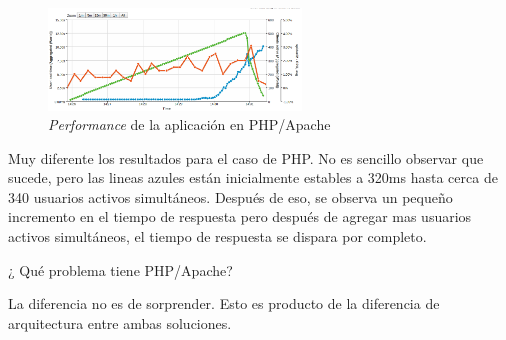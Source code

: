 

\begin{figure}[h!]
	\centering
	\includegraphics[width=0.6\textwidth]{figuras/cap2/phpapache_benchmak_loadimpact.png}
	\caption{\textit{Performance} de la aplicación en PHP/Apache}
	\label{cap2:figure:java_benchmark_paypal}
\end{figure}

Muy diferente los resultados para el caso de PHP. No es sencillo observar que sucede, pero las lineas azules están inicialmente estables a 320ms hasta cerca de 340 usuarios activos simultáneos. Después de eso, se observa un pequeño incremento en el tiempo de respuesta pero después de agregar mas usuarios activos simultáneos, el tiempo de respuesta se dispara por completo. 

¿ Qué problema tiene PHP/Apache?

La diferencia no es de sorprender. Esto es producto de la diferencia de arquitectura entre ambas soluciones.


